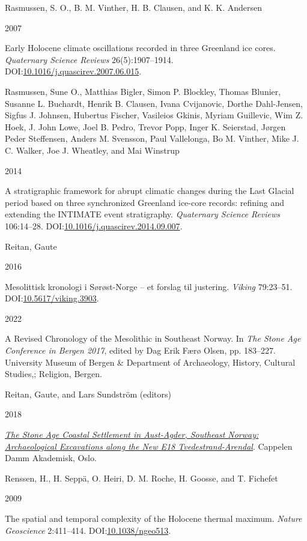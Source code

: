 \documentclass[
  a4paper,
  oneside]{uiophdthesis}
\newlength{\cslhangindent}
\newlength{\csllabelwidth}
\newlength{\cslentryspacingunit} %
\newenvironment{CSLReferences}[2] %
 {%
  \setlength{\parindent}{0pt}
  \ifodd #1
  \let\oldpar\par
  \def\par{\hangindent=\cslhangindent\oldpar}
  \fi
  \setlength{\parskip}{#2\cslentryspacingunit}
 }%
 {}
\newcommand{\CSLBlock}[1]{#1\hfill\break}
\newcommand{\CSLLeftMargin}[1]{\parbox[t]{\csllabelwidth}{#1}}
\newcommand{\CSLRightInline}[1]{\parbox[t]{\linewidth - \csllabelwidth}{#1}\break}
\begin{document}
\begin{CSLReferences}{0}{0}
\leavevmode{}%
\CSLBlock{Rasmussen, S. O., B. M. Vinther, H. B. Clausen, and K. K. Andersen}
\CSLLeftMargin{ 2007}
\CSLRightInline{{Early Holocene climate oscillations recorded in three Greenland ice cores}. \emph{Quaternary Science Reviews} 26(5):1907--1914. DOI:\href{https://doi.org/10.1016/j.quascirev.2007.06.015}{10.1016/j.quascirev.2007.06.015}.}

\leavevmode{}%
\CSLBlock{Rasmussen, Sune O., Matthias Bigler, Simon P. Blockley, Thomas Blunier, Susanne L. Buchardt, Henrik B. Clausen, Ivana Cvijanovic, Dorthe Dahl-Jensen, Sigfus J. Johnsen, Hubertus Fischer, Vasileios Gkinis, Myriam Guillevic, Wim Z. Hoek, J. John Lowe, Joel B. Pedro, Trevor Popp, Inger K. Seierstad, Jørgen Peder Steffensen, Anders M. Svensson, Paul Vallelonga, Bo M. Vinther, Mike J. C. Walker, Joe J. Wheatley, and Mai Winstrup}
\CSLLeftMargin{ 2014}
\CSLRightInline{{A stratigraphic framework for abrupt climatic changes during the Last Glacial period based on three synchronized Greenland ice-core records: refining and extending the INTIMATE event stratigraphy}. \emph{Quaternary Science Reviews} 106:14--28. DOI:\href{https://doi.org/10.1016/j.quascirev.2014.09.007}{10.1016/j.quascirev.2014.09.007}.}

\leavevmode{}%
\CSLBlock{Reitan, Gaute}
\CSLLeftMargin{ 2016}
\CSLRightInline{{Mesolittisk kronologi i Sørøst-Norge -- et forslag til justering}. \emph{Viking} 79:23--51. DOI:\href{https://doi.org/10.5617/viking.3903}{10.5617/viking.3903}.}

\leavevmode{}%
\CSLLeftMargin{ 2022 }
\CSLRightInline{{A Revised Chronology of the Mesolithic in Southeast Norway}. In \emph{{The Stone Age Conference in Bergen 2017}}, edited by Dag Erik Færø Olsen, pp. 183--227. University Museum of Bergen \& Department of Archaeology, History, Cultural Studies,; Religion, Bergen.}

\leavevmode{}%
\CSLBlock{Reitan, Gaute, and Lars Sundström (editors)}
\CSLLeftMargin{ 2018}
\CSLRightInline{\emph{\href{https://doi.org/10.23865/noasp.50}{{The Stone Age Coastal Settlement in Aust-Agder, Southeast Norway: Archaeological Excavations along the New E18 Tvedestrand-Arendal}}}. Cappelen Damm Akademisk, Oslo.}

\leavevmode{}%
\CSLBlock{Renssen, H., H. Seppä, O. Heiri, D. M. Roche, H. Goosse, and T. Fichefet}
\CSLLeftMargin{ 2009}
\CSLRightInline{{The spatial and temporal complexity of the Holocene thermal maximum}. \emph{Nature Geoscience} 2:411--414. DOI:\href{https://doi.org/10.1038/ngeo513}{10.1038/ngeo513}.}


\end{CSLReferences}
\end{document}
